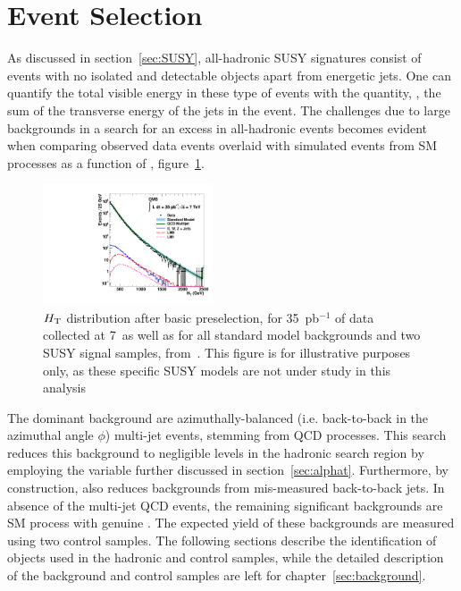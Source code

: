\clearpage
\section{Event Selection\label{sec:eventSelection}}

As discussed in section~\ref{sec:SUSY}, all-hadronic SUSY signatures consist of events with
no isolated and detectable objects apart from energetic jets. One can quantify the
total visible energy in these type of events with the quantity, \scalht, the sum of 
the transverse energy of the jets in the event. The challenges due to large
backgrounds in a search for an excess in all-hadronic events becomes evident 
when comparing observed data events overlaid with simulated events from 
SM processes as a function of \scalht, figure~\ref{fig:HT-distribution}.

\begin{figure}[h!t]
  \begin{center}
      \includegraphics[width=0.45\textwidth,]{figures/data-mc/AllcombinedHT_all.pdf}
      \caption{\label{fig:ht} $\mbox{$H_\text{T}$}$ distribution after basic preselection,
           for 35~pb$^{-1}$ of data collected at {7}~\tev as well as for all 
           standard model backgrounds and two SUSY signal samples, from~\cite{RA1Paper}. 
           This figure is for illustrative purposes only, as these specific SUSY 
           models are not under study in this analysis}
    \label{fig:HT-distribution}
  \end{center}
\end{figure}

The dominant background are azimuthally-balanced (i.e. back-to-back in the azimuthal angle 
$\phi$) multi-jet events, stemming from QCD processes. This search reduces this background 
to negligible levels in the hadronic search region by employing the \alphat variable further 
discussed in section~\ref{sec:alphat}. Furthermore, by construction, \alphat also reduces 
backgrounds from mis-measured back-to-back jets. In absence of the multi-jet QCD events,
the remaining significant backgrounds are SM process with genuine \met. The expected 
yield of these backgrounds are measured using two control samples. The following sections
describe the identification of objects used in the hadronic and control samples, while the 
detailed description of the background and control samples are left for 
chapter~\ref{sec:background}.

